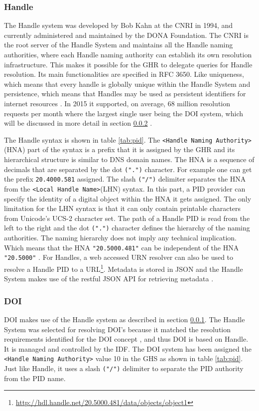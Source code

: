 \subsubsection{Handle}\label{hndl}
The Handle system was developed by Bob Kahn at the CNRI in 1994, and currently administered and maintained by the DONA Foundation. The CNRI is the root server of the Handle System and maintains all the Handle naming authorities, where each Handle naming authority can establish its own resolution infrastructure. This makes it possible for the GHR to delegate queries for Handle resolution. 
Its main functionalities are specified in RFC 3650. Like uniqueness, which means that every handle is globally unique within the Handle System and persistence, which means that Handles may be used as persistent identifiers for internet resources \cite{rfc3650}. In 2015 it supported, on average, 68 million resolution requests per month where the largest single user being the DOI system, which will be discussed in more detail in section \ref{doi} \cite{hdl-us}. 

The Handle syntax is shown in table \ref{tab:pid}. The \texttt{\textless Handle Naming Authority\textgreater} (HNA) part of the syntax is a prefix that it is assigned by the GHR and its hierarchical structure is similar to DNS domain names. The HNA is a sequence of decimals that are separated by the dot \texttt{(".")} character. For example one can get the prefix \texttt{20.4000.581} assigned. The slash \texttt{("/")} delimiter separates the HNA from the \texttt{\textless Local Handle Name\textgreater}(LHN) syntax. In this part, a PID provider can specify the identity of a digital object within the HNA it gets assigned. The only limitation for the LHN syntax is that it can only contain printable characters from Unicode's UCS-2 character set. The path of a Handle PID is read from the left to the right and the dot \texttt{(".")} character defines the hierarchy of the naming authorities. The naming hierarchy does not imply any technical implication. Which means that the HNA \texttt{"20.5000.481"} can be independent of the HNA \texttt{"20.5000"} \cite{icn-bd}. For Handles, a web accessed URN resolver can also be used to resolve a Handle PID to a URL\footnote{\url{http://hdl.handle.net/20.5000.481/data/objects/object1}}. Metadata is stored in JSON and the Handle System makes use of the restful JSON API for retrieving metadata \cite{hdl-api}.

\subsubsection{DOI}\label{doi}
DOI makes use of the Handle system as described in section \ref{hndl}. The Handle System was selected for resolving DOI's because it matched the resolution requirements identified for the DOI concept \cite{doi-found}, and thus DOI is based on Handle. It is managed and controlled by the IDF. The DOI system has been assigned the \texttt{<Handle Naming Authority>} value 10 in the GHS as shown in table \ref{tab:pid}. Just like Handle, it uses a slash \texttt{("/")} delimiter to separate the PID authority from the PID name.

